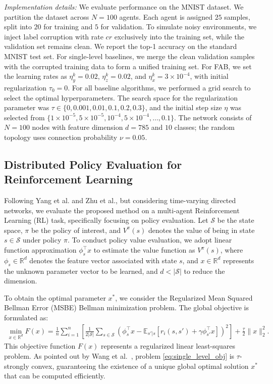 \documentclass{article}
\theoremstyle{plain}
\theoremstyle{definition}
\theoremstyle{remark}
\begin{document}
\textit{Implementation details:}
We evaluate performance on the MNIST dataset.
We partition the dataset across $N=100$ agents.
Each agent is assigned $25$ samples, split into $20$ for training and $5$ for validation. To simulate noisy environments, we inject label corruption with rate $cr$ exclusively into the training set, while the validation set remains clean.
We report the top-1 accuracy on the standard MNIST test set. 
For single-level baselines, we merge the clean validation samples with the corrupted training data to form a unified training set. For FAB, we set the learning rates as $\eta_{y}^{k}=0.02$, $\eta_{z}^{k}=0.02$, and $\eta_{x}^{k}=3\times 10^{-4}$, with initial regularization $\tau_0=0$. For all baseline algorithms, we performed a grid search to select the optimal hyperparameters. The search space for the regularization parameter was $\tau \in \{0, 0.001, 0.01, 0.1, 0.2, 0.3\}$, and the initial step size $\eta$ was selected from $\{1{\times}10^{-5}, 5{\times}10^{-5}, 10^{-4}, 5{\times}10^{-4}, \dots, 0.1\}$.
The network consists of $N=100$ nodes with feature dimension $d=785$ and $10$ classes; the random topology uses connection probability $\nu=0.05$. 




\subsection{Distributed Policy Evaluation for Reinforcement Learning} 
\label{app:details_rl}

Following Yang et al. and Zhu et al., but considering time-varying directed networks, we evaluate the proposed method on a multi-agent Reinforcement Learning (RL) task, specifically focusing on policy evaluation. Let $\mathcal{S}$ be the state space, $\pi$ be the policy of interest, and $V^{\pi}(s)$ denotes the value of being in state  $s\in\mathcal{S}$ under policy $\pi$. 
To conduct policy value evaluation, 
we adopt linear function approximation $\phi_s^\top x$ to estimate the value function as $V^\pi(s)$, where $\phi_s \in \mathbb{R}^d$ denotes the feature vector associated with state $s$, and $x \in \mathbb{R}^d$ represents the unknown parameter vector to be learned, and $d<|\mathcal{S}|$ to reduce the dimension.

To obtain the optimal parameter $x^*$, we consider the Regularized Mean Squared Bellman Error (MSBE) Bellman minimization problem. The global objective is formulated as:
\begin{align} \label{eq:single_level_obj}
    \min_{x \in \mathbb{R}^d} F(x) = \frac{1}{n} \sum_{i=1}^n \left[ \frac{1}{2|\mathcal{S}|} \sum_{s \in \mathcal{S}} \left( \phi_s^\top x - \mathbb{E}_{s'|s} \left[ r_i(s, s') + \gamma \phi_{s'}^\top x \right] \right)^2 \right] + \frac{\tau}{2}\|x\|_2^{2}.
\end{align}
This objective function $F(x)$ represents a regularized linear least-squares problem. As pointed out by Wang et al.~\cite{wangComposition2017}, problem \eqref{eq:single_level_obj} is $\tau$-strongly convex, guaranteeing the existence of a unique global optimal solution $x^*$ that can be computed efficiently.
\end{document}
